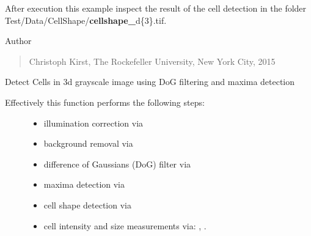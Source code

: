 \documentclass[letterpaper,10pt,english]{sphinxmanual}
\begin{document}
After execution this example inspect the result of the cell detection in
the folder Test/Data/CellShape/{\color{red}\bfseries{}cellshape\_}d\{3\}.tif.

Author
\begin{quote}

Christoph Kirst, The Rockefeller University, New York City, 2015
\end{quote}

\begin{fulllineitems}
\label{api/ClearMap.ImageProcessing:ClearMap.ImageProcessing.SpotDetection.detectSpots}
Detect Cells in 3d grayscale image using DoG filtering and maxima detection
\begin{description}
\item[{Effectively this function performs the following steps:}] \leavevmode\begin{itemize}
\item {} 
illumination correction via {\hyperref[api/ClearMap.ImageProcessing:ClearMap.ImageProcessing.IlluminationCorrection.correctIllumination]{\emph{}}}

\item {} 
background removal via {\hyperref[api/ClearMap.ImageProcessing:ClearMap.ImageProcessing.BackgroundRemoval.removeBackground]{\emph{}}}

\item {} 
difference of Gaussians (DoG) filter via 

\item {} 
maxima detection via {\hyperref[api/ClearMap.ImageProcessing:ClearMap.ImageProcessing.MaximaDetection.findExtendedMaxima]{\emph{}}}

\item {} 
cell shape detection via {\hyperref[api/ClearMap.ImageProcessing:ClearMap.ImageProcessing.CellSizeDetection.detectCellShape]{\emph{}}}

\item {} 
cell intensity and size measurements via: {\hyperref[api/ClearMap.ImageProcessing:ClearMap.ImageProcessing.CellSizeDetection.findCellIntensity]{\emph{}}},
{\hyperref[api/ClearMap.ImageProcessing:ClearMap.ImageProcessing.CellSizeDetection.findCellSize]{\emph{}}}.


\end{itemize}
\end{description}
\end{fulllineitems}
\end{document}
